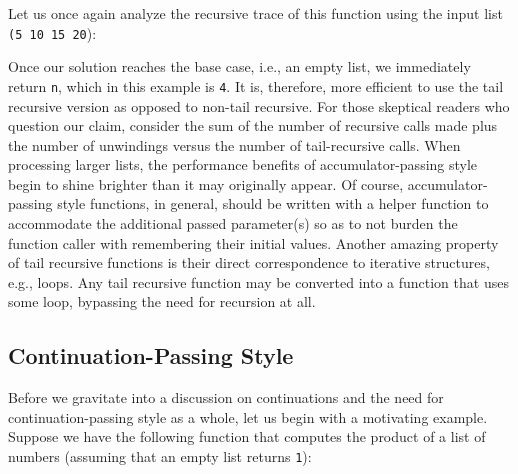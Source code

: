 Let us once again analyze the recursive trace of this function using the input list \texttt{\textquotesingle(5 10 15 20}):

\begin{center}
\end{center}

Once our  solution reaches the base case, i.e., an empty list, we immediately return \texttt{n}, which in this example is \texttt{4}. It is, therefore, more efficient to use the tail recursive version as opposed to non-tail recursive. For those skeptical readers who question our claim, consider the sum of the number of recursive calls made plus the number of unwindings versus the number of tail-recursive calls. When processing larger lists, the performance benefits of accumulator-passing style begin to shine brighter than it may originally appear. Of course, accumulator-passing style functions, in general, should be written with a helper function to accommodate the additional passed parameter(s) so as to not burden the function caller with remembering their initial values. Another amazing property of tail recursive functions is their direct correspondence to iterative structures, e.g., loops. Any tail recursive function may be converted into a function that uses some loop, bypassing the need for recursion at all.

\subsection*{Continuation-Passing Style}
Before we gravitate into a discussion on continuations and the need for continuation-passing style as a whole, let us begin with a motivating example. Suppose we have the following function that computes the product of a list of numbers (assuming that an empty list returns \texttt{1}):

